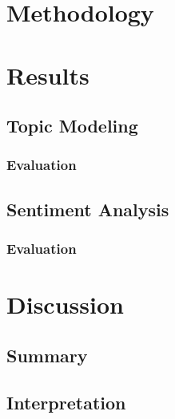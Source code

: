 \documentclass[12pt,english,titlepage,a4paper]{article}
\begin{document}

\tableofcontents
\pagebreak





\section{Methodology}







\section{Results}
\subsection{Topic Modeling}
\subsubsection{Evaluation}
\subsection{Sentiment Analysis}
\subsubsection{Evaluation}


\section{Discussion}
\subsection{Summary}
\subsection{Interpretation}
\end{document}
